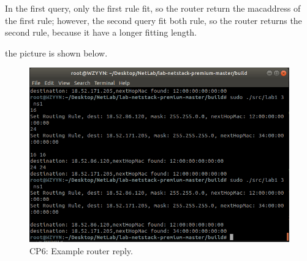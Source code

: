 \documentclass[11pt]{article}
\begin{document}
	\par In the first query, only the first rule fit, so the router return the macaddress of the first rule; however, the second query fit both rule, so the router returns the second rule, because it have a longer fitting length.
	
	\par the picture is shown below. 
	
	\begin{figure}[htbp]
		\centering
		\includegraphics[width=0.9\linewidth]{../lab-netstack-premium-master/checkpoints/CP6.png}
		\caption{CP6: Example router reply.}
		\label{fig:CP5-1}
	\end{figure}
		
\end{document}
